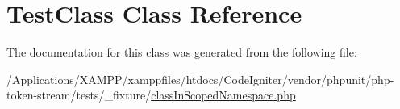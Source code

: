 \hypertarget{class_foo_1_1_bar_scoped_1_1_test_class}{}\section{Test\+Class Class Reference}
\label{class_foo_1_1_bar_scoped_1_1_test_class}


The documentation for this class was generated from the following file\+:\begin{DoxyCompactItemize}
\item 
/\+Applications/\+X\+A\+M\+P\+P/xamppfiles/htdocs/\+Code\+Igniter/vendor/phpunit/php-\/token-\/stream/tests/\+\_\+fixture/\mbox{\hyperlink{class_in_scoped_namespace_8php}{class\+In\+Scoped\+Namespace.\+php}}\end{DoxyCompactItemize}
